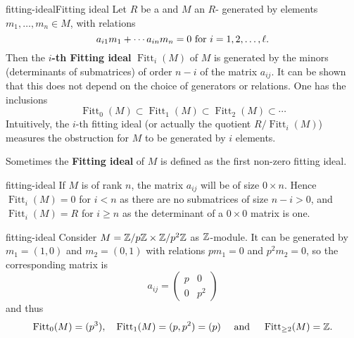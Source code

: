 \begin{topic}{fitting-ideal}{Fitting ideal}
    Let $R$ be a  and $M$ an $R$- generated by elements $m_1, \ldots, m_n \in M$, with relations
    \[ a_{i1} m_1 + \cdots a_{in} m_n = 0 \textup{ for } i = 1, 2, \ldots, \ell . \]
    Then the \textbf{$i$-th Fitting ideal} $\operatorname{Fitt}_i(M)$ of $M$ is generated by the minors (determinants of submatrices) of order $n - i$ of the matrix $a_{ij}$. It can be shown that this does not depend on the choice of generators or relations. One has the inclusions
    \[ \operatorname{Fitt}_0(M) \subset \operatorname{Fitt}_1(M) \subset \operatorname{Fitt}_2(M) \subset \cdots \]
    Intuitively, the $i$-th fitting ideal (or actually the quotient $R / \operatorname{Fitt}_i(M)$) measures the obstruction for $M$ to be generated by $i$ elements.
    
    Sometimes the \textbf{Fitting ideal} of $M$ is defined as the first non-zero fitting ideal.
\end{topic}

\begin{example}{fitting-ideal}
    If $M$ is  of rank $n$, the matrix $a_{ij}$ will be of size $0 \times n$. Hence $\operatorname{Fitt}_i(M) = 0$ for $i < n$ as there are no submatrices of size $n - i > 0$, and $\operatorname{Fitt}_i(M) = R$ for $i \ge n$ as the determinant of a $0 \times 0$ matrix is one.
\end{example}

\begin{example}{fitting-ideal}
    Consider $M = \mathbb{Z} / p \mathbb{Z} \times \mathbb{Z} / p^2 \mathbb{Z}$ as $\mathbb{Z}$-module. It can be generated by $m_1 = (1, 0)$ and $m_2 = (0, 1)$ with relations $p m_1 = 0$ and $p^2 m_2 = 0$, so the corresponding matrix is
    \[ a_{ij} = \begin{pmatrix} p & 0 \\ 0 & p^2 \end{pmatrix} \]
    and thus
    \[ \operatorname{Fitt}_0(M) = (p^3), \quad \operatorname{Fitt}_1(M) = (p, p^2) = (p) \quad \textup{ and } \quad \operatorname{Fitt}_{\ge 2}(M) = \mathbb{Z} . \]
\end{example}

